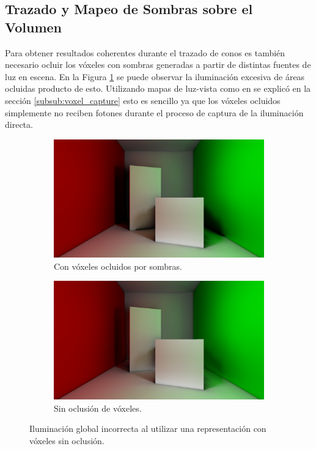 \subsection{Trazado y Mapeo de Sombras sobre el Volumen} %
\label{sub:trazado_de_sombras_sobre_el_volumen}

Para obtener resultados coherentes durante el trazado de conos es también necesario ocluir los vóxeles con sombras generadas a partir de distintas fuentes de luz en escena. En la Figura \ref{fig:voxel_shadow_error} se puede observar la iluminación excesiva de áreas ocluidas producto de esto. Utilizando mapas de luz-vista como en se explicó en la sección \ref{subsub:voxel_capture} esto es sencillo ya que los vóxeles ocluidos simplemente no reciben fotones durante el proceso de captura de la iluminación directa.

\begin{figure}[H]
	\centering
	\begin{subfigure}[t]{0.49\textwidth}
		\centering
		\captionsetup{justification=centering}
		\includegraphics[width=\linewidth]{media/voxel_shadowing.png}
		\caption*{Con vóxeles ocluidos por sombras.}
	\end{subfigure}%
	\hspace{0.01\textwidth}
	\begin{subfigure}[t]{0.49\textwidth}
		\centering
		\captionsetup{justification=centering}
		\includegraphics[width=\linewidth]{media/voxel_noshadowing.png}
		\caption*{Sin oclusión de vóxeles.}
	\end{subfigure}%
	\caption{Iluminación global incorrecta al utilizar una representación con vóxeles sin oclusión.}
	\label{fig:voxel_shadow_error}
\end{figure}

